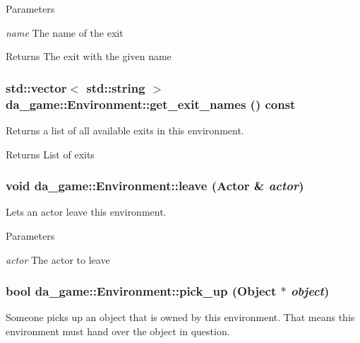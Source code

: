 \begin{DoxyParams}{Parameters}
\item[{\em name}]The name of the exit \end{DoxyParams}
\begin{DoxyReturn}{Returns}
The exit with the given name 
\end{DoxyReturn}
\hypertarget{classda__game_1_1Environment_a1702d13f246e537540f1073a138a706d}{
\subsubsection[{get\_\-exit\_\-names}]{\setlength{\rightskip}{0pt plus 5cm}std::vector$<$ std::string $>$ da\_\-game::Environment::get\_\-exit\_\-names () const}}
\label{classda__game_1_1Environment_a1702d13f246e537540f1073a138a706d}
Returns a list of all available exits in this environment.

\begin{DoxyReturn}{Returns}
List of exits 
\end{DoxyReturn}
\hypertarget{classda__game_1_1Environment_aed5b6d00da5afb0dae96bedcb9ee9642}{
\subsubsection[{leave}]{\setlength{\rightskip}{0pt plus 5cm}void da\_\-game::Environment::leave ({\bf Actor} \& {\em actor})}}
\label{classda__game_1_1Environment_aed5b6d00da5afb0dae96bedcb9ee9642}
Lets an actor leave this environment.


\begin{DoxyParams}{Parameters}
\item[{\em actor}]The actor to leave \end{DoxyParams}
\hypertarget{classda__game_1_1Environment_a1160cb0cffc0f37e058f58457c76d12b}{
\subsubsection[{pick\_\-up}]{\setlength{\rightskip}{0pt plus 5cm}bool da\_\-game::Environment::pick\_\-up ({\bf Object} $\ast$ {\em object})}}
\label{classda__game_1_1Environment_a1160cb0cffc0f37e058f58457c76d12b}
Someone picks up an object that is owned by this environment. That means this environment must hand over the object in question.


